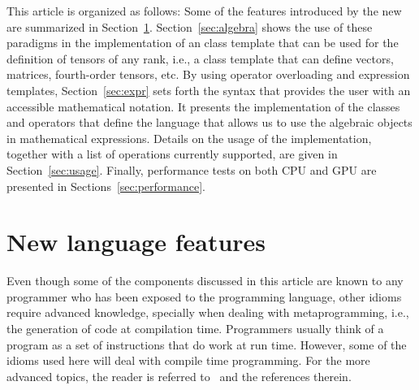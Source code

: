 \documentclass[11pt]{article}
\def\ifmonospace{\ifdim\fontdimen3\font=0pt }
\def\C++{\ifmonospace C++\else C\kern-.1667em\raise.50ex\hbox{\tiny{\textbf{+}\kern-.1em\textbf{+}}}\fi \spacefactor1000 }
\def\CPP11{\ifmonospace C++11\else C\kern-.1667em\raise.50ex\hbox{\tiny{\textbf{+}\kern-.1em\textbf{+}}}\kern-.1em11\fi \spacefactor1000 }
\newcommand{\code}[1]{{\footnotesize\ttfamily{#1}}}
\begin{document}
This article is organized as follows:
Some of the \C++ features introduced by the new \CPP11 are summarized in Section~\ref{sec:C++11}.
Section~\ref{sec:algebra} shows the use of these paradigms in the implementation of an \code{Array} class template that can be used for the definition of tensors of any rank, i.e., a class template that can define vectors, matrices, fourth-order tensors, etc. 
By using operator overloading and expression templates, Section~\ref{sec:expr} sets forth the syntax that provides the user with an accessible mathematical notation.
It presents the implementation of the classes and operators that define the language that allows us to use the algebraic objects in mathematical expressions. Details on the usage of the implementation, together with a list of operations currently supported, are given in Section~\ref{sec:usage}. Finally, performance tests on both CPU and GPU are presented in Sections~\ref{sec:performance}.



\section{New \CPP11 language features} \label{sec:C++11}


Even though some of the components discussed in this article are known to any programmer who has been exposed to the \C++ programming language, other idioms require advanced knowledge, specially when dealing with metaprogramming, i.e., the generation of code at compilation time. Programmers usually think of a program as a set of instructions that do work at run time. However, some of the idioms used here will deal with compile time programming.
For the more advanced topics, the reader is referred to~\cite{Veldhuizen:1995, Alexandrescu:2001} and the references therein.
\end{document}
